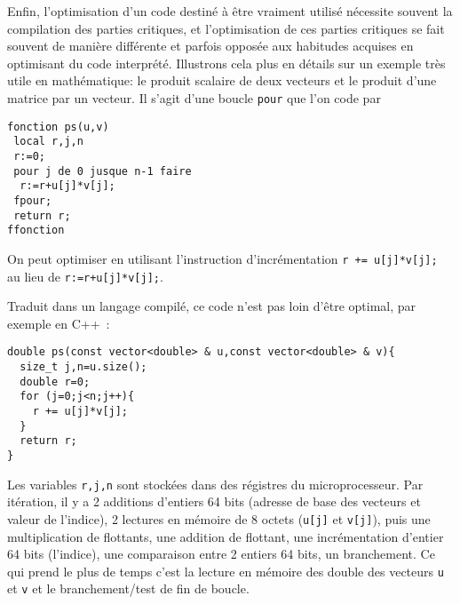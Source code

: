 \documentclass[12pt,a4paper]{book}
\begin{document}
\begin{giacjshere}
Enfin, l'optimisation d'un code destin\'e à \^etre vraiment utilis\'e
n\'ecessite souvent la compilation des parties critiques, et l'optimisation
de ces parties critiques se fait souvent de mani\`ere diff\'erente et
parfois oppos\'ee aux habitudes acquises en optimisant du code interpr\'et\'e.
Illustrons cela plus en d\'etails
sur un exemple tr\`es utile en math\'ematique: le produit
scalaire de deux vecteurs et le produit d'une matrice
par un vecteur. Il s'agit d'une boucle \verb|pour|
que l'on code par
\begin{verbatim}
fonction ps(u,v)
 local r,j,n
 r:=0;
 pour j de 0 jusque n-1 faire
  r:=r+u[j]*v[j];
 fpour;
 return r;
ffonction
\end{verbatim}
On peut optimiser en utilisant l'instruction d'incr\'ementation
\verb|r += u[j]*v[j];| au lieu de \verb|r:=r+u[j]*v[j];|.

Traduit dans un langage compil\'e, 
ce code n'est pas loin d'\^etre optimal, 
par exemple en C++~:
\begin{verbatim}
double ps(const vector<double> & u,const vector<double> & v){
  size_t j,n=u.size();
  double r=0;
  for (j=0;j<n;j++){
    r += u[j]*v[j];
  }
  return r;
}
\end{verbatim}
Les variables \verb|r,j,n| sont stock\'ees dans des r\'egistres
du microprocesseur. Par it\'eration, 
il y a 2 additions d'entiers 64 bits 
(adresse de base des vecteurs et valeur de l'indice), 2 lectures
en m\'emoire de 8 octets (\verb|u[j]| et \verb|v[j]|),
puis une multiplication de flottants, une addition de flottant,
une incr\'ementation d'entier 64 bits (l'indice), une comparaison
entre 2 entiers 64 bits, un branchement. Ce qui prend le plus de
temps c'est la lecture en m\'emoire des double des
vecteurs \verb|u| et \verb|v|
et le branchement/test de fin de boucle.


\end{giacjshere}
\end{document}
